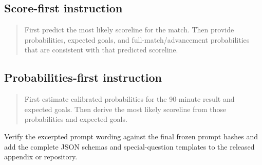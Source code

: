 \documentclass[sigconf,review]{acmart}
\newcommand{\TODO}[1]{{\color{red}#1}}
\begin{document}
\subsection*{Score-first instruction}
\begin{quote}\small
First predict the most likely scoreline for the match. Then provide probabilities, expected goals,
and full-match/advancement probabilities that are consistent with that predicted scoreline.
\end{quote}

\subsection*{Probabilities-first instruction}
\begin{quote}\small
First estimate calibrated probabilities for the 90-minute result and expected goals. Then derive the
most likely scoreline from those probabilities and expected goals.
\end{quote}

\TODO{Verify the excerpted prompt wording against the final frozen prompt hashes and add the complete JSON schemas and special-question templates to the released appendix or repository.}
\end{document}
